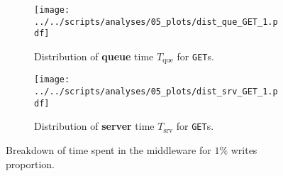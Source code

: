 \documentclass[11pt]{article}
\theoremstyle{definition}
\newcommand\Tque{T_{\mathrm{que}}}
\newcommand\Tsrv{T_{\mathrm{srv}}}
\renewcommand\b[1]{{\bf{#1}}}
\renewcommand\t\texttt
\begin{document}
\begin{figure}[!h]
    \begin{subfigure}[t]{\wdt}
        \centering
        \texttt{[image: ../../scripts/analyses/05\_plots/dist\_que\_GET\_1.pdf]}
        \caption{Distribution of \b{queue} time $\Tque$ for \t{GET}s.}\label{fig:05_breakdown-que-get-1}
    \end{subfigure}
    \hspace{0.2cm}
    \begin{subfigure}[t]{\wdt}
        \centering
        \texttt{[image: ../../scripts/analyses/05\_plots/dist\_srv\_GET\_1.pdf]}
        \caption{Distribution of \b{server} time $\Tsrv$ for \t{GET}s.}\label{fig:05_breakdown-srv-get-1}
    \end{subfigure}
    \caption{Breakdown of time spent in the middleware for $1\%$ writes proportion.}
    \label{fig:05_breakdown-1}
\end{figure}
\end{document}
